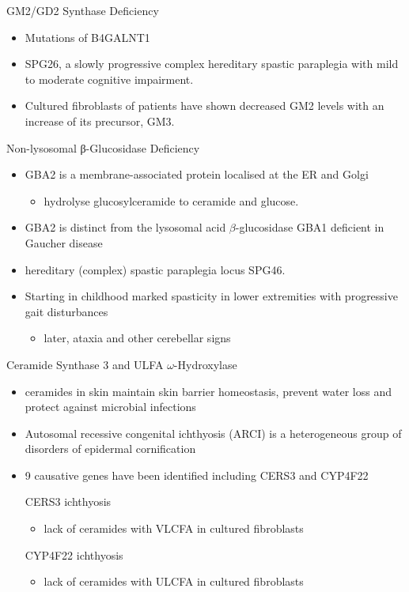 \documentclass[presentation, smaller]{beamer}
\begin{document}
\begin{frame}[label={sec:orgheadline11}]{GM2/GD2 Synthase Deficiency}
\begin{itemize}
\item Mutations of B4GALNT1
\item SPG26, a slowly progressive complex hereditary spastic paraplegia
with mild to moderate cognitive impairment.

\item Cultured fibroblasts of patients have shown decreased GM2 levels
with an increase of its precursor, GM3.
\end{itemize}
\end{frame}

\begin{frame}[label={sec:orgheadline12}]{Non-lysosomal β-Glucosidase Deficiency}
\begin{itemize}
\item GBA2 is a membrane-associated protein localised at the ER and Golgi
\begin{itemize}
\item hydrolyse glucosylceramide to ceramide and glucose.
\end{itemize}
\item GBA2 is distinct from the lysosomal acid \(\beta\)-glucosidase GBA1 deficient in Gaucher disease
\item hereditary (complex) spastic paraplegia locus SPG46.
\item Starting in childhood marked spasticity in lower extremities with
progressive gait disturbances
\begin{itemize}
\item later, ataxia and other cerebellar signs
\end{itemize}
\end{itemize}
\end{frame}

\begin{frame}[label={sec:orgheadline13}]{Ceramide Synthase 3 and ULFA \(\omega\)-Hydroxylase}
\begin{itemize}
\item ceramides in skin maintain skin barrier homeostasis, prevent water
loss and protect against microbial infections
\item Autosomal recessive congenital ichthyosis (ARCI) is a heterogeneous
group of disorders of epidermal cornification
\item 9 causative genes have been identified including CERS3 and CYP4F22

\item[{CERS3}] ichthyosis
\begin{itemize}
\item lack of ceramides with VLCFA in cultured fibroblasts
\end{itemize}
\item[{CYP4F22}] ichthyosis
\begin{itemize}
\item lack of ceramides with ULCFA in cultured fibroblasts
\end{itemize}
\end{itemize}
\end{frame}
\end{document}
